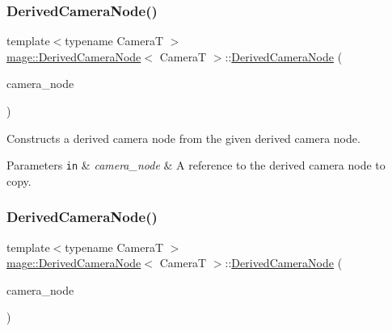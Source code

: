 \subsubsection{\texorpdfstring{Derived\+Camera\+Node()}{DerivedCameraNode()}\hspace{0.1cm}{\footnotesize\ttfamily [2/3]}}
{\footnotesize\ttfamily template$<$typename CameraT $>$ \\
\hyperlink{classmage_1_1_derived_camera_node}{mage\+::\+Derived\+Camera\+Node}$<$ CameraT $>$\+::\hyperlink{classmage_1_1_derived_camera_node}{Derived\+Camera\+Node} (\begin{DoxyParamCaption}\item[{const \hyperlink{classmage_1_1_derived_camera_node}{Derived\+Camera\+Node}$<$ CameraT $>$ \&}]{camera\+\_\+node }\end{DoxyParamCaption})}

Constructs a derived camera node from the given derived camera node.


\begin{DoxyParams}[1]{Parameters}
\mbox{\tt in}  & {\em camera\+\_\+node} & A reference to the derived camera node to copy. \\
\hline
\end{DoxyParams}
\hypertarget{classmage_1_1_derived_camera_node_a61ef46c03fc23258ef134fbb93cff742}{}\label{classmage_1_1_derived_camera_node_a61ef46c03fc23258ef134fbb93cff742} 
\subsubsection{\texorpdfstring{Derived\+Camera\+Node()}{DerivedCameraNode()}\hspace{0.1cm}{\footnotesize\ttfamily [3/3]}}
{\footnotesize\ttfamily template$<$typename CameraT $>$ \\
\hyperlink{classmage_1_1_derived_camera_node}{mage\+::\+Derived\+Camera\+Node}$<$ CameraT $>$\+::\hyperlink{classmage_1_1_derived_camera_node}{Derived\+Camera\+Node} (\begin{DoxyParamCaption}\item[{\hyperlink{classmage_1_1_derived_camera_node}{Derived\+Camera\+Node}$<$ CameraT $>$ \&\&}]{camera\+\_\+node }\end{DoxyParamCaption})\hspace{0.3cm}{\ttfamily [noexcept]}}


